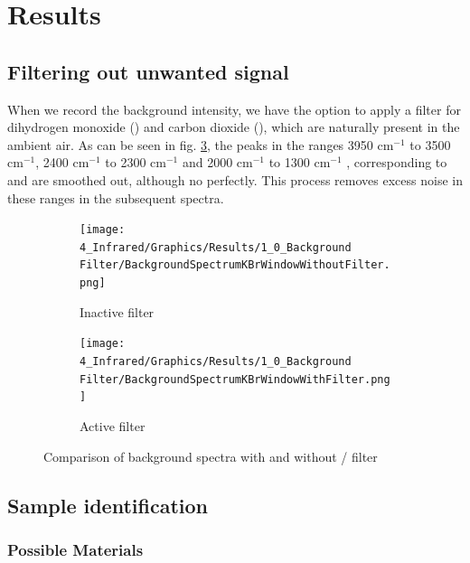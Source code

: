 \documentclass[12pt]{article}
\begin{document}
\newpage

\section{Results}

\subsection{Filtering out unwanted signal}

When we record the background intensity, we have the option to apply a filter for dihydrogen monoxide () and carbon dioxide (), which are naturally present in the ambient air. As can be seen in fig. \ref{fig:KBrBackgroundSpectraComparison}, the peaks in the ranges 3950 cm$^{-1}$ to 3500 cm$^{-1}$, 2400 cm$^{-1}$ to 2300 cm$^{-1}$ and 2000 cm$^{-1}$ to 1300 cm$^{-1}$ , corresponding to  and  are smoothed out, although no perfectly. This process removes excess noise in these ranges in the subsequent spectra.

\begin{figure}[!ht]
    \begin{subfigure}[t]{0.5\textwidth}
        \centering
        \texttt{[image: 4\_Infrared/Graphics/Results/1\_0\_Background Filter/BackgroundSpectrumKBrWindowWithoutFilter.png]}
        \caption{Inactive filter}
        \label{fig:KBrBackgroundWithoutFilter}
    \end{subfigure}
    \hfill
    \begin{subfigure}[t]{0.5\textwidth}
        \centering
        \texttt{[image: 4\_Infrared/Graphics/Results/1\_0\_Background Filter/BackgroundSpectrumKBrWindowWithFilter.png]}
        \caption{Active filter}
        \label{fig:KBrBackgroundWithFilter}
    \end{subfigure}
    \caption{Comparison of background spectra with and without / filter}
    \label{fig:KBrBackgroundSpectraComparison}
\end{figure}
\FloatBarrier

\subsection{Sample identification}

\subsubsection{Possible Materials}
\end{document}
